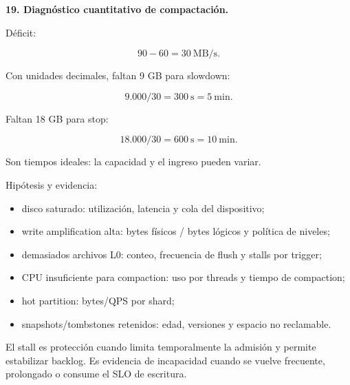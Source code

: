 \documentclass[variant=guiaresuelta,cover=institutional,mode=screen]{ua-engineering-v6-article}
\begin{document}
\begin{uaexercise}
\textbf{19. Diagnóstico cuantitativo de compactación.}
\end{uaexercise}
\begin{uaanswer}
Déficit:

\[
90-60=30\ \text{MB/s}.
\]

Con unidades decimales, faltan 9 GB para slowdown:

\[
9.000/30=300\ \text{s}=5\ \text{min}.
\]

Faltan 18 GB para stop:

\[
18.000/30=600\ \text{s}=10\ \text{min}.
\]

Son tiempos ideales: la capacidad y el ingreso pueden variar.

Hipótesis y evidencia:

\begin{itemize}
\item disco saturado: utilización, latencia y cola del dispositivo;
\item write amplification alta: bytes físicos / bytes lógicos y política de niveles;
\item demasiados archivos L0: conteo, frecuencia de flush y stalls por trigger;
\item CPU insuficiente para compaction: uso por threads y tiempo de compaction;
\item hot partition: bytes/QPS por shard;
\item snapshots/tombstones retenidos: edad, versiones y espacio no reclamable.
\end{itemize}

El stall es protección cuando limita temporalmente la admisión y permite estabilizar backlog. Es evidencia de incapacidad cuando se vuelve frecuente, prolongado o consume el SLO de escritura.
\end{uaanswer}
\end{document}
